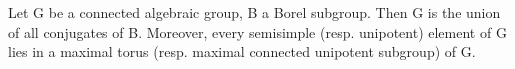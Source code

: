 Let G be a connected algebraic group, B a Borel subgroup. Then G is the union of all conjugates of B. Moreover, every semisimple (resp. unipotent) element of G lies in a maximal torus (resp. maximal connected unipotent subgroup) of G.
